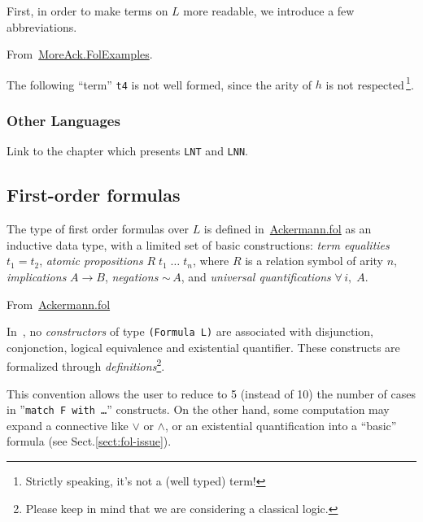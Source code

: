 First, in order to make terms on $L$ more readable, we introduce a few abbreviations.


From~\href{../theories/html/hydras.MoreAck.FolExamples.html}{MoreAck.FolExamples}.




The following ``term'' \texttt{t4} is not well formed, since the arity of $h$ is not respected\,\footnote{Strictly speaking, it's not a (well typed) term!}.


\subsubsection{Other Languages}

\begin{todo}
Link to the chapter which presents \texttt{LNT} and \texttt{LNN}.
\end{todo}

\subsection{First-order formulas}



The type of first order formulas over $L$ is defined 
in~\href{../theories/html/hydras.Ackermann.fol.html}{Ackermann.fol} as an inductive data type, with a limited set of basic constructions:
\emph{term equalities} $t_1=t_2$,
\emph{atomic propositions} $R\;t_1\;\dots\;t_n$, where $R$ is a relation symbol of arity $n$,
\emph{implications} $A \rightarrow B$,
\emph{negations} $\sim\,A$,
and \emph{universal quantifications} $\forall\,i,\;A$.

\vspace{6pt}

\noindent From~\href{../theories/html/hydras.Ackermann.fol.html}{Ackermann.fol}




\begin{remark}

In~\cite{Goedel}, no \emph{constructors} of type \texttt{(Formula L)} are associated with
disjunction, conjonction, logical equivalence and existential quantifier. These constructs are formalized through \emph{definitions}\footnote{Please keep in mind that we are considering a classical logic.}.


This convention allows the user to reduce to 5 (instead of 10) the number of cases in ''\texttt{match F with \dots}'' constructs. On the other hand, some computation may expand a connective like $\vee$ or
$\wedge$, or an existential quantification into a ``basic'' formula (see Sect.\vref{sect:fol-issue}).
\end{remark}

